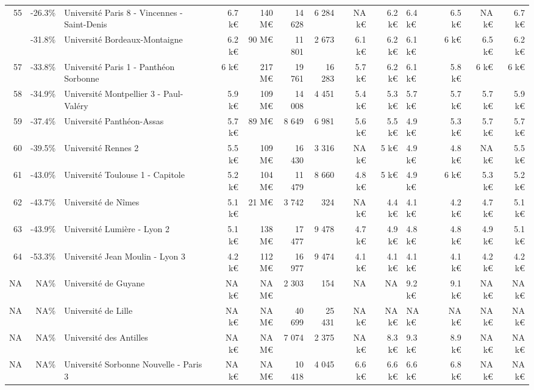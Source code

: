 \documentclass[12pt,french,landscape]{article}
\begin{document}
\begin{longtable}{rrlrrrrrrlrrr}
\rowcolor{gray!6}  55 & -26.3\% & Université Paris 8 - Vincennes - Saint-Denis & 6.7 k€ & 140 M€ & 14 628 & 6 284 & NA k€ & 6.2 k€ & 6.4 k€ & 6.5 k€ & NA k€ & 6.7 k€\\
\addlinespace
56 & -31.8\% & Université Bordeaux-Montaigne & 6.2 k€ & 90 M€ & 11 801 & 2 673 & 6.1 k€ & 6.2 k€ & 6.1 k€ & 6 k€ & 6.5 k€ & 6.2 k€\\
\rowcolor{gray!6}  57 & -33.8\% & Université Paris 1 - Panthéon Sorbonne & 6 k€ & 217 M€ & 19 761 & 16 283 & 5.7 k€ & 6.2 k€ & 6.1 k€ & 5.8 k€ & 6 k€ & 6 k€\\
58 & -34.9\% & Université Montpellier 3 - Paul-Valéry & 5.9 k€ & 109 M€ & 14 008 & 4 451 & 5.4 k€ & 5.3 k€ & 5.7 k€ & 5.7 k€ & 5.7 k€ & 5.9 k€\\
\rowcolor{gray!6}  59 & -37.4\% & Université Panthéon-Assas & 5.7 k€ & 89 M€ & 8 649 & 6 981 & 5.6 k€ & 5.5 k€ & 4.9 k€ & 5.3 k€ & 5.7 k€ & 5.7 k€\\
60 & -39.5\% & Université Rennes 2 & 5.5 k€ & 109 M€ & 16 430 & 3 316 & NA k€ & 5 k€ & 4.9 k€ & 4.8 k€ & NA k€ & 5.5 k€\\
\addlinespace
\rowcolor{gray!6}  61 & -43.0\% & Université Toulouse 1 - Capitole & 5.2 k€ & 104 M€ & 11 479 & 8 660 & 4.8 k€ & 5 k€ & 4.9 k€ & 6 k€ & 5.3 k€ & 5.2 k€\\
62 & -43.7\% & Université de Nîmes & 5.1 k€ & 21 M€ & 3 742 & 324 & NA k€ & 4.4 k€ & 4.1 k€ & 4.2 k€ & 4.7 k€ & 5.1 k€\\
\rowcolor{gray!6}  63 & -43.9\% & Université Lumière - Lyon 2 & 5.1 k€ & 138 M€ & 17 477 & 9 478 & 4.7 k€ & 4.9 k€ & 4.8 k€ & 4.8 k€ & 4.9 k€ & 5.1 k€\\
64 & -53.3\% & Université Jean Moulin - Lyon 3 & 4.2 k€ & 112 M€ & 16 977 & 9 474 & 4.1 k€ & 4.1 k€ & 4.1 k€ & 4.1 k€ & 4.2 k€ & 4.2 k€\\
\rowcolor{gray!6}  NA & NA\% & Université de Guyane & NA k€ & NA M€ & 2 303 & 154 & NA & NA & 9.2 k€ & 9.1 k€ & NA k€ & NA k€\\
\addlinespace
NA & NA\% & Université de Lille & NA k€ & NA M€ & 40 699 & 25 431 & NA k€ & NA k€ & NA k€ & NA k€ & NA k€ & NA k€\\
\rowcolor{gray!6}  NA & NA\% & Université des Antilles & NA k€ & NA M€ & 7 074 & 2 375 & NA k€ & 8.3 k€ & 9.3 k€ & 8.9 k€ & NA k€ & NA k€\\
NA & NA\% & Université Sorbonne Nouvelle - Paris 3 & NA k€ & NA M€ & 10 418 & 4 045 & 6.6 k€ & 6.6 k€ & 6.6 k€ & 6.8 k€ & NA k€ & NA k€\\*
\end{longtable}
\end{document}
